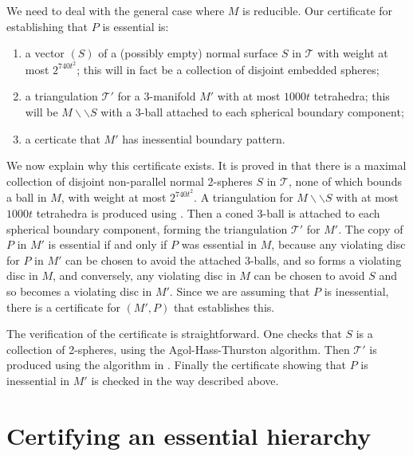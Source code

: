 \documentclass[oneside]{amsart}
\numberwithin{equation}{section}
\theoremstyle{plain}
\theoremstyle{definition}
\newcommand{\calT}{{\mathcal{T}}}
\newcommand{\cut}{\backslash\backslash}
\begin{document}
We need to deal with the general case where $M$ is reducible. Our certificate for establishing that $P$ is essential is:
\begin{enumerate}
\item a vector $(S)$ of a (possibly empty) normal surface $S$ in $\mathcal{T}$ with weight at most $2^{740t^2}$; this will in fact be a collection of disjoint embedded spheres;
\item a triangulation $\mathcal{T}'$ for a 3-manifold $M'$ with at most $1000t$ tetrahedra; this will be $M \cut S$ with a 3-ball attached to each spherical boundary component;
\item a certicate that $M'$ has inessential boundary pattern.
\end{enumerate}

We now explain why this certificate exists.
It is proved in \cite[Lemma 4]{King} that there is a maximal collection of disjoint non-parallel normal 2-spheres $S$ in $\mathcal{T}$, none of which bounds a ball in $M$, 
with weight at most $2^{740t^2}$.
A triangulation for $M \cut S$ with at most $1000t$ tetrahedra is produced using \cite[Theorem 11.4]{Lackenby:EfficientCertification}. Then a coned 3-ball
is attached to each spherical boundary component, forming the triangulation $\mathcal{T}'$ for $M'$. 
The copy of $P$ in $M'$ is essential if and only if $P$ was essential in $M$, because
any violating disc for $P$ in $M'$ can be chosen to avoid the attached 3-balls, and so forms a violating disc in $M$, and conversely, any violating disc in $M$ can be chosen to avoid $S$ and so becomes a violating disc in $M'$. Since we are assuming that $P$ is inessential, there is a certificate for $(M',P)$ that establishes this.

The verification of the certificate is straightforward. One checks that $S$ is a collection of 2-spheres, using the
Agol-Hass-Thurston algorithm. Then $\calT'$ is produced using the algorithm in \cite[Theorem 11.4]{Lackenby:EfficientCertification}.
Finally the certificate showing that $P$ is inessential in $M'$ is checked in the way described above.

\section{Certifying an essential hierarchy}
\label{Sec:CertifyingEssentialHierarchy}
\end{document}
